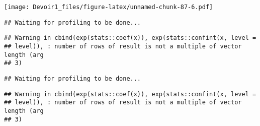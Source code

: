 \documentclass[]{article}
\newenvironment{Shaded}{\begin{snugshade}}{\end{snugshade}}
\newcommand{\KeywordTok}[1]{\textcolor[rgb]{0.13,0.29,0.53}{\textbf{#1}}}
\newcommand{\DataTypeTok}[1]{\textcolor[rgb]{0.13,0.29,0.53}{#1}}
\newcommand{\DecValTok}[1]{\textcolor[rgb]{0.00,0.00,0.81}{#1}}
\newcommand{\StringTok}[1]{\textcolor[rgb]{0.31,0.60,0.02}{#1}}
\newcommand{\OperatorTok}[1]{\textcolor[rgb]{0.81,0.36,0.00}{\textbf{#1}}}
\newcommand{\NormalTok}[1]{#1}
\begin{document}
\texttt{[image: Devoir1\_files/figure-latex/unnamed-chunk-87-6.pdf]}

\begin{Shaded}
\end{Shaded}

\begin{verbatim}
## Waiting for profiling to be done...
\end{verbatim}

\begin{verbatim}
## Warning in cbind(exp(stats::coef(x)), exp(stats::confint(x, level =
## level)), : number of rows of result is not a multiple of vector length (arg
## 3)
\end{verbatim}

\begin{verbatim}
## Waiting for profiling to be done...
\end{verbatim}

\begin{verbatim}
## Warning in cbind(exp(stats::coef(x)), exp(stats::confint(x, level =
## level)), : number of rows of result is not a multiple of vector length (arg
## 3)
\end{verbatim}
\end{document}
